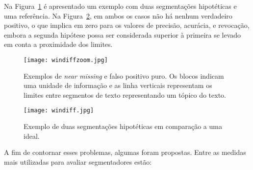 Na Figura~\ref{fig:exemplosegmentacaozoom} é apresentado um exemplo com duas segmentações hipotéticas e uma referência. Na Figura~\ref{fig:exemplosegmentacao}, em ambos os casos não há nenhum verdadeiro positivo, o que implica em zero para os valores de precisão, acurácia, e revocação, embora a segunda hipótese possa ser considerada superior à primeira se levado em conta a proximidade dos limites.



  \begin{figure}[!h]

	\centering
	\texttt{[image: windiffzoom.jpg]}
	\caption{Exemplos de \textit{near missing} e falso positivo puro. Os blocos indicam uma unidade de informação e as linha verticais representam os limites entre segmentos de texto representando um tópico do texto. }
	\label{fig:exemplosegmentacaozoom}

  \end{figure}
  
  \begin{figure}[!h]

	\centering
	\texttt{[image: windiff.jpg]}
	\caption{
	Exemplo de duas segmentações hipotéticas em comparação a uma ideal. 
	}
	\label{fig:exemplosegmentacao}

  \end{figure}
  

A fim de contornar esses problemas, algumas foram propostas. Entre as medidas mais utilizadas para avaliar segmentadores estão:

